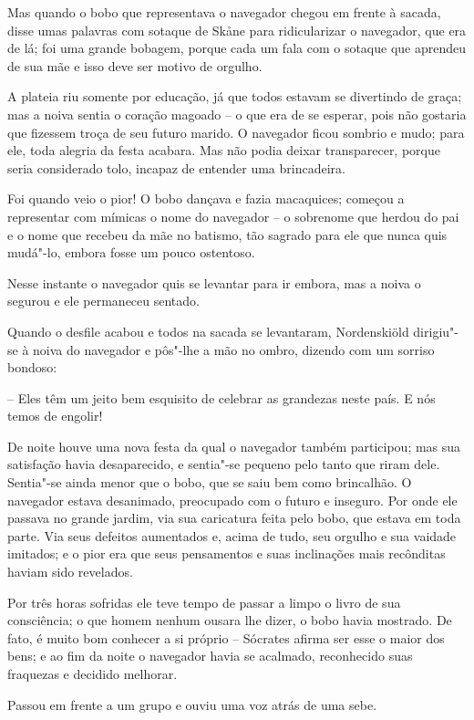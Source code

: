 Mas quando o bobo que representava o navegador chegou em frente à
sacada, disse umas palavras com sotaque de Sk\r ane para ridicularizar o
navegador, que era de lá; foi uma grande bobagem, porque cada um fala
com o sotaque que aprendeu de sua mãe e isso deve ser motivo de
orgulho. 

A plateia riu somente por educação, já que todos estavam se divertindo
de graça; mas a noiva sentia o coração magoado -- o que era de se
esperar, pois não gostaria que fizessem troça de seu futuro marido. O
navegador ficou sombrio e mudo; para ele, toda alegria da festa
acabara. Mas não podia deixar transparecer, porque seria considerado
tolo, incapaz de entender uma brincadeira.

Foi quando veio o pior! O bobo dançava e fazia macaquices; começou a
representar com mímicas o nome do navegador -- o sobrenome que herdou do
pai e o nome que recebeu da mãe no batismo, tão sagrado para ele que
nunca quis mudá"-lo, embora fosse um pouco ostentoso.

Nesse instante o navegador quis se levantar para ir embora, mas a noiva
o segurou e ele permaneceu sentado.

Quando o desfile acabou e todos na sacada se levantaram, Nordenskiöld
dirigiu"-se  à noiva do navegador e pôs"-lhe a mão no ombro, dizendo
com um sorriso bondoso:

-- Eles têm um jeito bem esquisito de celebrar as grandezas neste país. E
nós temos de engolir!

De noite houve uma nova festa da qual o navegador também participou; mas
sua satisfação havia desaparecido, e sentia"-se pequeno pelo tanto que
riram dele. Sentia"-se ainda menor que o bobo, que se saiu bem como
brincalhão. O navegador estava desanimado, preocupado com o futuro e
inseguro. Por onde ele passava no grande jardim, via sua caricatura
feita pelo bobo, que estava em toda parte. Via seus defeitos aumentados
e, acima de tudo, seu orgulho e sua vaidade imitados; e o pior era que
seus pensamentos e suas inclinações mais recônditas haviam sido 
revelados.

Por três horas sofridas ele teve tempo de passar a limpo o livro de sua
consciência; o que homem nenhum ousara lhe dizer, o bobo havia
mostrado. De fato, é muito bom conhecer a si próprio -- Sócrates afirma
ser esse o maior dos bens; e ao fim da noite o navegador havia se
acalmado, reconhecido suas fraquezas e decidido melhorar.

Passou em frente a um grupo e ouviu uma voz atrás de uma sebe.

